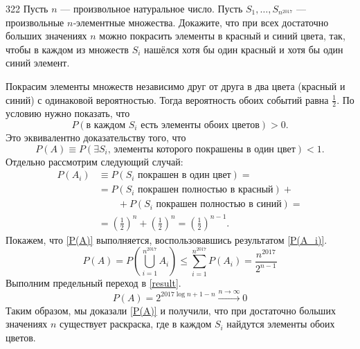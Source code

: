 \begin{task}{322}
Пусть $n$ — произвольное натуральное число. Пусть $S_1, \dots, S_{n^{2017}}$ — произвольные $n$‑элементные множества. Докажите, что при всех достаточно больших значениях $n$ можно покрасить элементы в красный и синий цвета, так, чтобы в каждом из множеств $S_i$ нашёлся хотя бы один красный и хотя бы один синий элемент.
\end{task}

\begin{solution}
Покрасим элементы множеств независимо друг от друга в два цвета (красный и синий) с одинаковой вероятностью. Тогда вероятность обоих событий равна $\frac{1}{2}$. По условию нужно показать, что
\begin{equation*}
    P(\text{в каждом }S_i\text{ есть элементы обоих цветов})>0.
\end{equation*}
Это эквивалентно доказательству того, что
\begin{equation}\label{P(A)}
    P(A)\equiv P(\exists S_i\text{, элементы которого покрашены в один цвет})<1.
\end{equation}
Отдельно рассмотрим следующий случай:
\begin{align}\label{P(A_i)}
    P(A_i)
    &\equiv P(S_i\text{ покрашен в один цвет})=\nonumber \\
      &=P(S_i\text{ покрашен полностью в красный})+\nonumber \\
      &\qquad+P(S_i\text{ покрашен полностью в синий})=\nonumber\\
    &=\left(\frac{1}{2}\right)^n+\left(\frac{1}{2}\right)^n=\left(\frac{1}{2}\right)^{n-1}.
\end{align}
Покажем, что \eqref{P(A)} выполняется, воспользовавшись результатом \eqref{P(A_i)}.
\begin{equation}\label{result}
    P(A)=P\left(\bigcup_{i = 1}^{n^{2017}}A_i\right)\leq\sum_{i = 1}^{n^{2017}}P(A_i)=\frac{n^{2017}}{2^{n-1}}
\end{equation}
Выполним предельный переход в \eqref{result}.
\begin{equation*}
    P(A)=2^{2017\log{n}+1-n}\xrightarrow{n\rightarrow \infty} 0
\end{equation*}
Таким образом, мы доказали \eqref{P(A)} и получили, что при достаточно больших значениях $n$ существует раскраска, где в каждом $S_i$ найдутся элементы обоих цветов. 
\end{solution}
